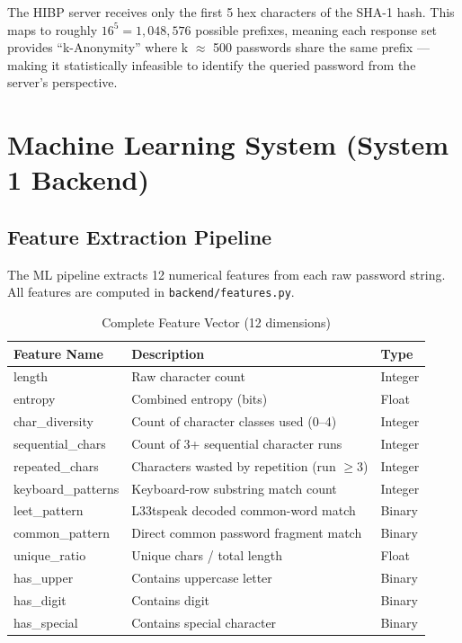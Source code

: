 \documentclass[12pt,a4paper]{article}
\begin{document}
\begin{infobox}[title={Privacy Guarantee}]
The HIBP server receives only the first 5 hex characters of the SHA-1 hash.
This maps to roughly $16^5 = 1{,}048{,}576$ possible prefixes, meaning
each response set provides ``k-Anonymity'' where k $\approx$ 500 passwords
share the same prefix --- making it statistically infeasible to identify
the queried password from the server's perspective.
\end{infobox}

\section{Machine Learning System (System 1 Backend)}

\subsection{Feature Extraction Pipeline}

The ML pipeline extracts 12 numerical features from each raw password string.
All features are computed in \texttt{backend/features.py}.

\begin{table}[H]
\centering
\begin{tabular}{>{\ttfamily}lp{6cm}l}
\toprule
\textbf{Feature Name} & \textbf{Description} & \textbf{Type} \\
\midrule
length          & Raw character count & Integer \\
entropy         & Combined entropy (bits) & Float \\
char\_diversity & Count of character classes used (0--4) & Integer \\
sequential\_chars & Count of 3+ sequential character runs & Integer \\
repeated\_chars & Characters wasted by repetition (run $\geq 3$) & Integer \\
keyboard\_patterns & Keyboard-row substring match count & Integer \\
leet\_pattern   & L33tspeak decoded common-word match & Binary \\
common\_pattern & Direct common password fragment match & Binary \\
unique\_ratio   & Unique chars / total length & Float \\
has\_upper      & Contains uppercase letter & Binary \\
has\_digit      & Contains digit & Binary \\
has\_special    & Contains special character & Binary \\
\bottomrule
\end{tabular}
\caption{Complete Feature Vector (12 dimensions)}
\end{table}
\end{document}
